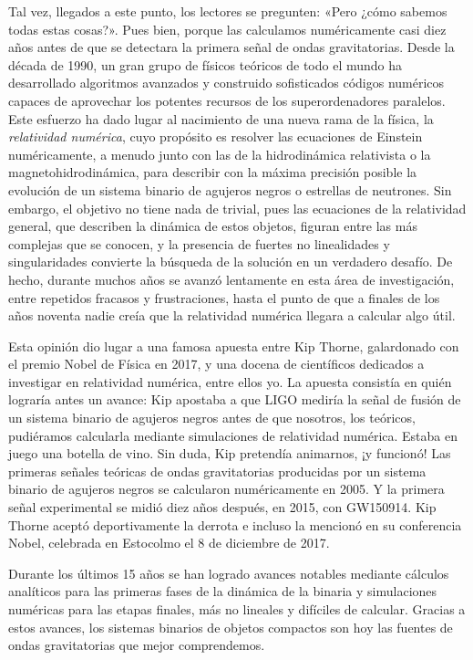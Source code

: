 Tal vez, llegados a este punto, los lectores se pregunten: «Pero ¿cómo sabemos todas estas cosas?». Pues bien, porque las calculamos numéricamente casi diez años antes de que se detectara la primera señal de ondas gravitatorias. Desde la década de 1990, un gran grupo de físicos teóricos de todo el mundo ha desarrollado algoritmos avanzados y construido sofisticados códigos numéricos capaces de aprovechar los potentes recursos de los superordenadores paralelos. Este esfuerzo ha dado lugar al nacimiento de una nueva rama de la física, la \emph{relatividad numérica}, cuyo propósito es resolver las ecuaciones de Einstein numéricamente, a menudo junto con las de la hidrodinámica relativista o la magnetohidrodinámica, para describir con la máxima precisión posible la evolución de un sistema binario de agujeros negros o estrellas de neutrones. Sin embargo, el objetivo no tiene nada de trivial, pues las ecuaciones de la relatividad general, que describen la dinámica de estos objetos, figuran entre las más complejas que se conocen, y la presencia de fuertes no linealidades y singularidades convierte la búsqueda de la solución en un verdadero desafío. De hecho, durante muchos años se avanzó lentamente en esta área de investigación, entre repetidos fracasos y frustraciones, hasta el punto de que a finales de los años noventa nadie creía que la relatividad numérica llegara a calcular algo útil.

Esta opinión dio lugar a una famosa apuesta entre Kip Thorne, galardonado con el premio Nobel de Física en 2017, y una docena de científicos dedicados a investigar en relatividad numérica, entre ellos yo. La apuesta consistía en quién lograría antes un avance: Kip apostaba a que LIGO mediría la señal de fusión de un sistema binario de agujeros negros antes de que nosotros, los teóricos, pudiéramos calcularla mediante simulaciones de relatividad numérica. Estaba en juego una botella de vino. Sin duda, Kip pretendía animarnos, ¡y funcionó! Las primeras señales teóricas de ondas gravitatorias producidas por un sistema binario de agujeros negros se calcularon numéricamente en 2005. Y la primera señal experimental se midió diez años después, en 2015, con GW150914. Kip Thorne aceptó deportivamente la derrota e incluso la mencionó en su conferencia Nobel, celebrada en Estocolmo el 8 de diciembre de 2017.

Durante los últimos 15 años se han logrado avances notables mediante cálculos analíticos para las primeras fases de la dinámica de la binaria y simulaciones numéricas para las etapas finales, más no lineales y difíciles de calcular. Gracias a estos avances, los sistemas binarios de objetos compactos son hoy las fuentes de ondas gravitatorias que mejor comprendemos.

